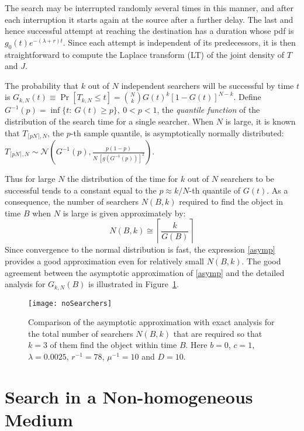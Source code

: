 \documentclass[journal]{IEEEtran}
\begin{document}
The search may be interrupted randomly several times in this manner, and after each interruption it starts again at the source after a further delay. The last and hence successful attempt at reaching the destination has a duration whose pdf is $g_0(t)e^{-(\lambda+r)t}$. Since each attempt is independent of its predecessors, it is then straightforward to compute the Laplace transform (LT) of the joint density of $T$ and $J$.



The probability that $k$ out of $N$ independent searchers will be successful by time $t$ is $G_{k,N}(t)\equiv \Pr[T_{k,N}\leq t] =\binom{N}{k}G(t)^k[1-G(t)]^{N-k}$. Define $G^{-1}(p) = \inf\{t:~G(t) \geq p\},~ 0<p<1$, the {\em quantile function} of the distribution of the search time for a single searcher. When $N$ is large, it is known that $T_{\lceil pN \rceil,N}$, the $p$-th sample quantile, is asymptotically normally distributed: $T_{\lceil pN \rceil,N} \sim \mathcal{N}\left(G^{-1}(p),\frac{p(1-p)}{N~[g(G^{-1}(p))]^2} \right)$.

Thus for large $N$ the distribution of the time for $k$ out of $N$ searchers to be successful tends to a constant equal to the $p\approx k/N$-th quantile of $G(t)$. As a consequence, the number of searchers $N(B,k)$ required to find the object in time $B$ when $N$ is large is given approximately by:
\begin{equation}
N(B,k) \cong \left\lceil \frac{k}{G(B)} \right\rceil \label{asymp}
\end{equation}
Since convergence to the normal distribution is fast, the expression \eqref{asymp} provides a good approximation even for relatively small $N(B,k)$. The good agreement between the asymptotic approximation of \eqref{asymp} and the
detailed analysis for $G_{k,N}(B)$ is illustrated in Figure~\ref{noSearchers}.

\begin{figure}[t]\centering
   \texttt{[image: noSearchers]}
   \caption{Comparison of the asymptotic approximation with exact analysis for the total number of searchers $N(B,k)$ that are required so that $k=3$ of them find the object within time $B$. Here $b=0$, $c=1$, $\lambda=0.0025$, $r^{-1} = 78$, $\mu^{-1}=10$ and $D=10$. } \label{noSearchers}
\end{figure}




\section{Search in a Non-homogeneous Medium}\label{non-hom}
\end{document}

